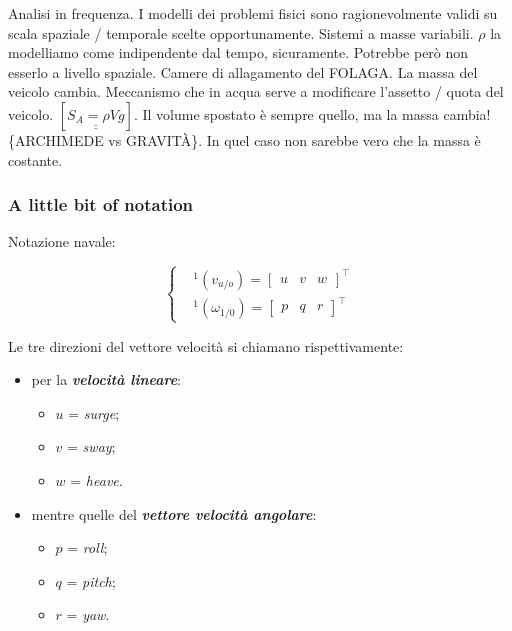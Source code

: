 Analisi in frequenza. I modelli dei problemi fisici sono ragionevolmente validi su scala spaziale / temporale scelte opportunamente. Sistemi a masse variabili. $\rho$ la modelliamo come indipendente dal tempo, sicuramente. Potrebbe però non esserlo a livello spaziale. Camere di allagamento del FOLAGA. La massa del veicolo cambia. Meccanismo che in acqua serve a modificare l'assetto / quota del veicolo. $[\underline{\underline{S_A = \rho V g}}]$. Il volume spostato è sempre quello, ma la massa cambia! \{ARCHIMEDE vs GRAVIT\`A\}. In quel caso non sarebbe vero che la massa è costante.

\subsubsection{A little bit of notation}

Notazione navale:

\[
	\left\{
	\begin{aligned}
	&^1(v_{u/o}) = \begin{bmatrix}u&v&w\end{bmatrix}^\top\\
	&^1(\omega_{1/0}) = \begin{bmatrix}p&q&r\end{bmatrix}^\top
	\end{aligned}
	\right.
\]

Le tre direzioni del vettore velocità si chiamano rispettivamente:

\begin{itemize}

\item per la \textbf{\textit{velocità lineare}}:

\begin{itemize} 
\item $u$ = \textit{surge};
\item $v$ = \textit{sway};
\item $w$ = \textit{heave}.
\end{itemize}

\item mentre quelle del \textbf{\textit{vettore velocità angolare}}:

\begin{itemize}
\item $p$ = \textit{roll};
\item $q$ = \textit{pitch};
\item $r$ = \textit{yaw}.
\end{itemize}

\end{itemize}

